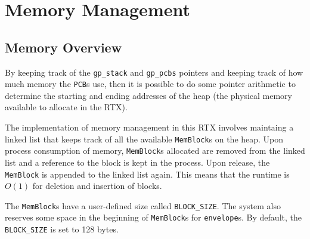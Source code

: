 \documentclass[12pt]{report}
\begin{document}
\section{Memory Management}

\subsection{Memory Overview}


By keeping track of the \texttt{gp_stack} and \texttt{gp_pcbs} pointers and keeping track of how much memory the \texttt{PCB}s use, then it is possible to do some pointer arithmetic to determine the starting and ending addresses of the heap (the physical memory available to allocate in the RTX).

The implementation of memory management in this RTX involves maintaing a linked list that keeps track of all the available \texttt{MemBlock}s on the heap. Upon process consumption of memory, \texttt{MemBlock}s allocated are removed from the linked list and a reference to the block is kept in the process. Upon release, the \texttt{MemBlock} is appended to the linked list again. This means that the runtime is $O(1)$ for deletion and insertion of blocks.

 The \texttt{MemBlock}s have a user-defined size called \texttt{BLOCK_SIZE}. The system also reserves some space in the beginning of \texttt{MemBlock}s for \texttt{envelope}s. By default, the \texttt{BLOCK_SIZE} is set to 128 bytes.
\end{document}
